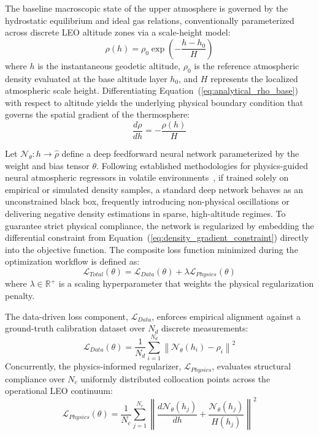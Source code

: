 \documentclass[letterpaper, preprint, 11pt]{AAS}
\begin{document}
The baseline macroscopic state of the upper atmosphere is governed by the hydrostatic equilibrium and ideal gas relations, conventionally parameterized across discrete LEO altitude zones via a scale-height model:
\begin{equation}
    \rho(h) = \rho_{0} \exp\left( -\frac{h - h_{0}}{H} \right)
    \label{eq:analytical_rho_base}
\end{equation}
where $h$ is the instantaneous geodetic altitude, $\rho_0$ is the reference atmospheric density evaluated at the base altitude layer $h_0$, and $H$ represents the localized atmospheric scale height. Differentiating Equation~(\ref{eq:analytical_rho_base}) with respect to altitude yields the underlying physical boundary condition that governs the spatial gradient of the thermosphere:
\begin{equation}
    \frac{d\rho}{dh} = -\frac{\rho(h)}{H}
    \label{eq:density_gradient_constraint}
\end{equation}

Let $\mathcal{N}_\theta: h \to \hat{\rho}$ define a deep feedforward neural network parameterized by the weight and bias tensor $\theta$. Following established methodologies for physics-guided neural atmospheric regressors in volatile environments~\cite{peng_physics-informed_2021,biswas_smooth_2024}, if trained solely on empirical or simulated density samples, a standard deep network behaves as an unconstrained black box, frequently introducing non-physical oscillations or delivering negative density estimations in sparse, high-altitude regimes. To guarantee strict physical compliance, the network is regularized by embedding the differential constraint from Equation~(\ref{eq:density_gradient_constraint}) directly into the objective function. The composite loss function minimized during the optimization workflow is defined as:
\begin{equation}
    \mathcal{L}_{Total}(\theta) = \mathcal{L}_{Data}(\theta) + \lambda \mathcal{L}_{Physics}(\theta)
    \label{eq:pinn_total_loss}
\end{equation}
where $\lambda \in \mathbb{R}^+$ is a scaling hyperparameter that weights the physical regularization penalty.

The data-driven loss component, $\mathcal{L}_{Data}$, enforces empirical alignment against a ground-truth calibration dataset over $N_d$ discrete measurements:
\begin{equation}
    \mathcal{L}_{Data}(\theta) = \frac{1}{N_d} \sum_{i=1}^{N_d} \left\| \mathcal{N}_\theta(h_i) - \rho_i \right\|^2
    \label{eq:l_data}
\end{equation}
Concurrently, the physics-informed regularizer, $\mathcal{L}_{Physics}$, evaluates structural compliance over $N_c$ uniformly distributed collocation points across the operational LEO continuum:
\begin{equation}
    \mathcal{L}_{Physics}(\theta) = \frac{1}{N_c} \sum_{j=1}^{N_c} \left\| \frac{d\mathcal{N}_\theta(h_j)}{dh} + \frac{\mathcal{N}_\theta(h_j)}{H(h_j)} \right\|^2
    \label{eq:l_physics}
\end{equation}
\end{document}

